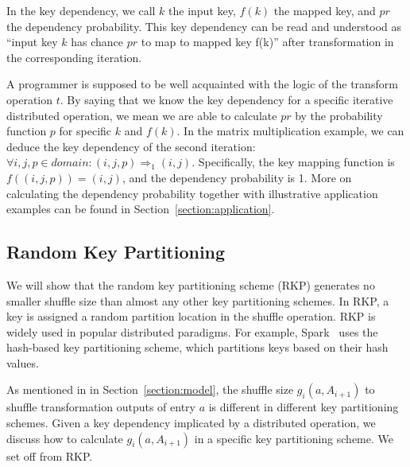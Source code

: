 \documentclass[10pt,journal,compsoc]{IEEEtran}
\begin{document}
In the key dependency, we call $k$ the input key, $f(k)$ the mapped key, 
and $pr$ the dependency probability.
This key dependency can be read and understood as 
``input key $k$ has chance $pr$ to map to mapped key f(k)'' after
transformation in the corresponding iteration.

A programmer is supposed to be well acquainted with the logic of the transform operation $t$. 
By saying that we know the key dependency for a specific iterative distributed operation,
we mean we are able to calculate $pr$ by the probability function 
$p$ for specific $k$ and $f(k)$.
In the matrix multiplication example, we can deduce
the key dependency of the second iteration: 
$\forall i, j, p \in domain: (i, j, p) \Rightarrow_{1} (i, j)$.  
Specifically, the key mapping function is $f((i, j, p)) = (i, j)$, 
and the dependency probability is 1. 
More on calculating the dependency probability together with illustrative
application examples can be found in Section~\ref{section:application}.




\subsection{Random Key Partitioning}\label{section:rkp}
We will show that the random key partitioning scheme (RKP) generates no
smaller shuffle size than almost any other key partitioning schemes. 
In RKP, a key is assigned a random partition location in the shuffle operation. 
RKP is widely used in popular distributed paradigms.
For example, Spark~\cite{zaharia2012resilient} uses the hash-based key partitioning scheme, which partitions keys based on their hash values. 

As mentioned in in Section~\ref{section:model}, the shuffle size $g_i(a, A_{i+1})$ to shuffle transformation outputs of entry $a$ is different in different key partitioning schemes. 
Given a key dependency implicated by a distributed operation, we discuss how to calculate $g_i(a, A_{i+1})$ in a specific key partitioning scheme. 
We set off from RKP.
\end{document}
